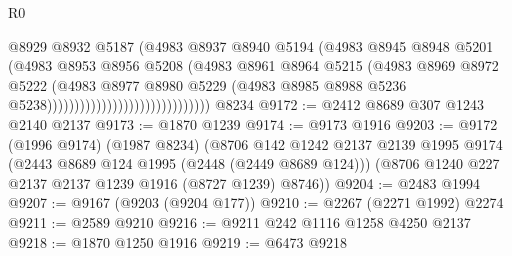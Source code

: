 \begin{lexlean}{R0}
\begin{coremodule}
                                                  @8929
                                                  @8932
                                                  @5187
                                                  (@4983
                                                    @8937
                                                    @8940
                                                    @5194
                                                    (@4983
                                                      @8945
                                                      @8948
                                                      @5201
                                                      (@4983
                                                        @8953
                                                        @8956
                                                        @5208
                                                        (@4983
                                                          @8961
                                                          @8964
                                                          @5215
                                                          (@4983
                                                            @8969
                                                            @8972
                                                            @5222
                                                            (@4983
                                                              @8977
                                                              @8980
                                                              @5229
                                                              (@4983
                                                                @8985
                                                                @8988
                                                                @5236
                                                                @5238))))))))))))))))))))))))))))))
    @8234
@9172 := @2412 @8689 @307 @1243 @2140 @2137
@9173 := @1870 @1239
@9174 := @9173 @1916
@9203 := @9172
    (@1996 @9174)
    (@1987 @8234)
    (@8706
      @142
      @1242
      @2137
      @2139
      @1995
      @9174
      (@2443 @8689 @124 @1995 (@2448 (@2449 @8689 @124)))
      (@8706 @1240 @227 @2137 @2137 @1239 @1916 (@8727 @1239) @8746))
@9204 := @2483 @1994
@9207 := @9167 (@9203 (@9204 @177))
@9210 := @2267 (@2271 @1992) @2274
@9211 := @2589 @9210
@9216 := @9211 @242 @1116 @1258 @4250 @2137
@9218 := @1870 @1250 @1916
@9219 := @6473 @9218

\end{coremodule}
\end{lexlean}
